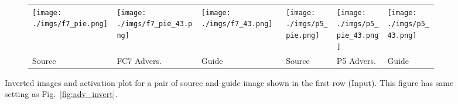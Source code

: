 \documentclass{article} %
\begin{document}
\begin{figure}[h!]
\begin{subfigure}[t]{\linewidth}
{\begin{tabular}
\hline
\end{tabular}
}
\end{subfigure}
\vspace*{0.2cm}

\begin{subfigure}[t]{\linewidth}{
\centering
\renewcommand{\arraystretch}{1}
\setlength\tabcolsep{.1pt}
\begin{tabular}{
|>{\centering\arraybackslash}m{0.205\linewidth}
>{\centering\arraybackslash}m{0.205\linewidth}
>{\centering\arraybackslash}m{0.205\linewidth}|
>{\centering\arraybackslash}m{0.125\linewidth}
>{\centering\arraybackslash}m{0.125\linewidth}
>{\centering\arraybackslash}m{0.125\linewidth}|
}
\hline
\texttt{[image: ./imgs/f7\_pie.png]} &
\texttt{[image: ./imgs/f7\_pie\_43.png]} &
\texttt{[image: ./imgs/f7\_43.png]} &
\texttt{[image: ./imgs/p5\_pie.png]} &
\texttt{[image: ./imgs/p5\_pie\_43.png]} &
\texttt{[image: ./imgs/p5\_43.png]}\\
Source & FC7 Advers. & Guide & Source & P5 Advers. & Guide \\ \hline
\end{tabular}
}
\end{subfigure}
\caption{
    Inverted images and activation plot for a pair of source and guide image
    shown in the first row (Input). This figure has same setting as
    Fig.~\ref{fig:adv_invert}.
}

\label{fig:adv_invert2}
\end{figure}\begin{figure*}[h!]


\end{figure*}
\end{document}
